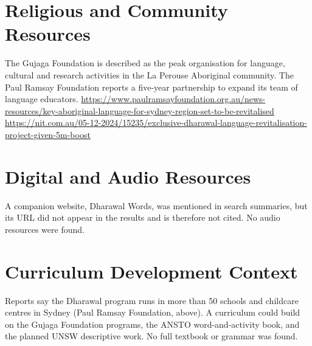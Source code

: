 \documentclass[12pt]{article}
\begin{document}
\section{Religious and Community Resources}
The Gujaga Foundation is described as the peak organisation for language, cultural and research activities in the La Perouse Aboriginal community. The Paul Ramsay Foundation reports a five-year partnership to expand its team of language educators. \url{https://www.paulramsayfoundation.org.au/news-resources/key-aboriginal-language-for-sydney-region-set-to-be-revitalised} \quad \url{https://nit.com.au/05-12-2024/15235/exclusive-dharawal-language-revitalisation-project-given-5m-boost}
\section{Digital and Audio Resources}
A companion website, Dharawal Words, was mentioned in search summaries, but its URL did not appear in the results and is therefore not cited. No audio resources were found.
\section{Curriculum Development Context}
Reports say the Dharawal program runs in more than 50 schools and childcare centres in Sydney (Paul Ramsay Foundation, above). A curriculum could build on the Gujaga Foundation programs, the ANSTO word-and-activity book, and the planned UNSW descriptive work. No full textbook or grammar was found.
\end{document}
